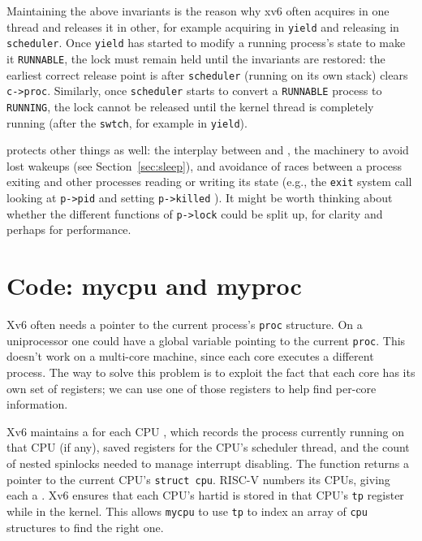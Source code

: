 Maintaining the above invariants is the reason why xv6 often acquires 
in one thread and releases it in other,
for example acquiring in
\lstinline{yield}
and releasing in
\lstinline{scheduler}.
Once \lstinline{yield} has started to modify a running process's state
to make it
\lstinline{RUNNABLE},
the lock must remain held until the invariants are restored:
the earliest correct release point is after
\lstinline{scheduler}
(running on its own stack)
clears
\lstinline{c->proc}.
Similarly, once 
\lstinline{scheduler}
starts to convert a \lstinline{RUNNABLE} process to
\lstinline{RUNNING},
the lock cannot be released until the kernel thread
is completely running (after the
\lstinline{swtch},
for example in
\lstinline{yield}).

protects other things as well:
the interplay between
and
,
the machinery to avoid lost wakeups (see Section~\ref{sec:sleep}),
and avoidance of races between a process exiting and other processes
reading or writing its state (e.g., the \lstinline{exit}
system call looking at \lstinline{p->pid} and
setting \lstinline{p->killed}
).
It might be worth thinking about whether the 
different functions of
\lstinline{p->lock}
could be split up, for clarity and perhaps
for performance.
\section{Code: mycpu and myproc}

Xv6 often needs a pointer to the current process's \lstinline{proc}
structure. On a uniprocessor one could have a global variable pointing
to the current \lstinline{proc}. This doesn't work on a multi-core
machine, since each core executes a different process. The way to
solve this problem is to exploit the fact that each core has its own
set of registers; we can use one of those registers to help find
per-core information.

Xv6 maintains a
for each CPU
,
which records
the process currently running
on that CPU (if any),
saved registers for the CPU's scheduler thread,
and the count of nested spinlocks needed to manage
interrupt disabling.
The function
returns a pointer to the current CPU's
\lstinline{struct cpu}.
RISC-V numbers its CPUs, giving each
a .
Xv6 ensures that each CPU's hartid is stored in that CPU's \lstinline{tp} register
while in the kernel.
This allows
\lstinline{mycpu} to use \lstinline{tp} to index an array
of \lstinline{cpu} structures to find the right one.

